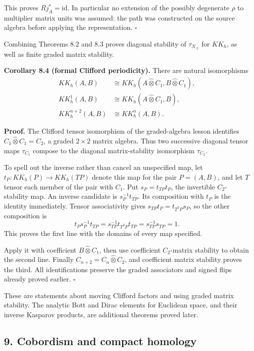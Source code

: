 \documentclass[
  11pt,
]{article}
\begin{document}
This proves \(Rj_A^*=\mathrm{id}\). In particular no extension of the
possibly degenerate \(\rho\) to multiplier matrix units was assumed: the
path was constructed on the source algebra before applying the
representation. \(\square\)

Combining Theorems 8.2 and 8.3 proves diagonal stability of
\(\tau_{\mathcal K_L}\) for \(KK_h\), as well as finite graded matrix
stability.

\textbf{Corollary 8.4 (formal Clifford periodicity).} There are natural
isomorphisms \[
\begin{aligned}
KK_h(A,B)&\cong KK_h(A\widehat\otimes C_1,
B\widehat\otimes C_1),\\
KK_h^1(A,B)&\cong KK_h(A\widehat\otimes C_1,B),\\
KK_h^{n+2}(A,B)&\cong KK_h^n(A,B).
\end{aligned}
\tag{8.7}
\]

\textbf{Proof.} The Clifford tensor isomorphism of the graded-algebra
lesson identifies \(C_1\widehat\otimes C_1=C_2\), a graded \(2\times2\)
matrix algebra. Thus two successive diagonal tensor maps \(\tau_{C_1}\)
compose to the diagonal matrix-stability isomorphism \(\tau_{C_2}\).

To spell out the inverse rather than cancel an unspecified map, let
\(t_P:KK_h(P)\to KK_h(TP)\) denote this map for the pair \(P=(A,B)\),
and let \(T\) tensor each member of the pair with \(C_1\). Put
\(s_P=t_{TP}t_P\), the invertible \(C_2\)-stability map. An inverse
candidate is \(s_P^{-1}t_{TP}\). Its composition with \(t_P\) is the
identity immediately. Tensor associativity gives
\(s_{TP}t_P=t_{T^2P}s_P\), so the other composition is \[
t_Ps_P^{-1}t_{TP}
=s_{TP}^{-1}t_{T^2P}t_{TP}
=s_{TP}^{-1}s_{TP}
=1.
\] This proves the first line with the domains of every map specified.

Apply it with coefficient \(B\widehat\otimes C_1\), then use coefficient
\(C_2\)-matrix stability to obtain the second line. Finally
\(C_{n+2}=C_n\widehat\otimes C_2\), and coefficient matrix stability
proves the third. All identifications preserve the graded associators
and signed flips already proved earlier. \(\square\)

These are statements about moving Clifford factors and using graded
matrix stability. The analytic Bott and Dirac elements for Euclidean
space, and their inverse Kasparov products, are additional theorems
proved later.

\subsection{9. Cobordism and compact
homology}\label{cobordism-and-compact-homology}
\end{document}
